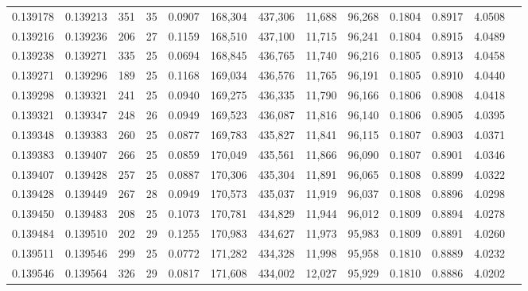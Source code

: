 \begin{tabular}{rrrrrrrrrrrrr}
0.139178 & 0.139213 & 351 &  35 &                                     0.0907 & 168,304 & 437,306 &  11,688 &  96,268 & 0.1804 & 0.8917 & 4.0508 \\
0.139216 & 0.139236 & 206 &  27 &                                     0.1159 & 168,510 & 437,100 &  11,715 &  96,241 & 0.1804 & 0.8915 & 4.0489 \\
0.139238 & 0.139271 & 335 &  25 &                                     0.0694 & 168,845 & 436,765 &  11,740 &  96,216 & 0.1805 & 0.8913 & 4.0458 \\
0.139271 & 0.139296 & 189 &  25 &                                     0.1168 & 169,034 & 436,576 &  11,765 &  96,191 & 0.1805 & 0.8910 & 4.0440 \\
0.139298 & 0.139321 & 241 &  25 &                                     0.0940 & 169,275 & 436,335 &  11,790 &  96,166 & 0.1806 & 0.8908 & 4.0418 \\
0.139321 & 0.139347 & 248 &  26 &                                     0.0949 & 169,523 & 436,087 &  11,816 &  96,140 & 0.1806 & 0.8905 & 4.0395 \\
0.139348 & 0.139383 & 260 &  25 &                                     0.0877 & 169,783 & 435,827 &  11,841 &  96,115 & 0.1807 & 0.8903 & 4.0371 \\
0.139383 & 0.139407 & 266 &  25 &                                     0.0859 & 170,049 & 435,561 &  11,866 &  96,090 & 0.1807 & 0.8901 & 4.0346 \\
0.139407 & 0.139428 & 257 &  25 &                                     0.0887 & 170,306 & 435,304 &  11,891 &  96,065 & 0.1808 & 0.8899 & 4.0322 \\
0.139428 & 0.139449 & 267 &  28 &                                     0.0949 & 170,573 & 435,037 &  11,919 &  96,037 & 0.1808 & 0.8896 & 4.0298 \\
0.139450 & 0.139483 & 208 &  25 &                                     0.1073 & 170,781 & 434,829 &  11,944 &  96,012 & 0.1809 & 0.8894 & 4.0278 \\
0.139484 & 0.139510 & 202 &  29 &                                     0.1255 & 170,983 & 434,627 &  11,973 &  95,983 & 0.1809 & 0.8891 & 4.0260 \\
0.139511 & 0.139546 & 299 &  25 &                                     0.0772 & 171,282 & 434,328 &  11,998 &  95,958 & 0.1810 & 0.8889 & 4.0232 \\
0.139546 & 0.139564 & 326 &  29 &                                     0.0817 & 171,608 & 434,002 &  12,027 &  95,929 & 0.1810 & 0.8886 & 4.0202 \\

\end{tabular}
